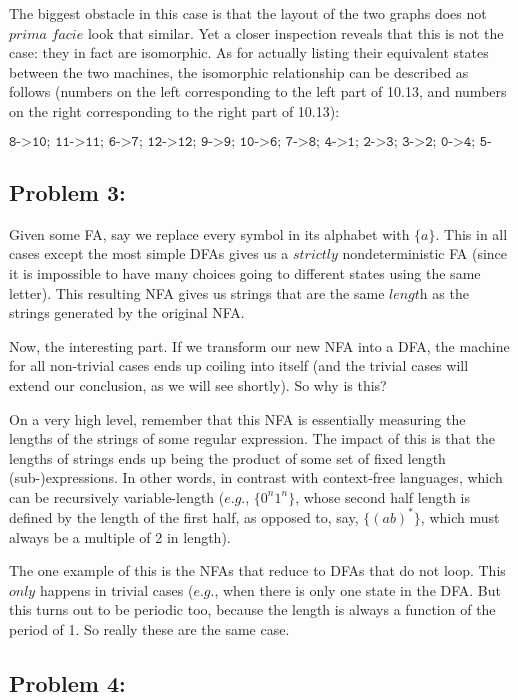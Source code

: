 \documentclass[a4paper]{article}
\begin{document}
The biggest obstacle in this case is that the layout of the two graphs does not $\textit{prima facie}$ look that similar. Yet a closer inspection reveals that this is not the case: they in fact are isomorphic. As for actually listing their equivalent states between the two machines, the isomorphic relationship can be described as follows (numbers on the left corresponding to the left part of 10.13, and numbers on the right corresponding to the right part of 10.13):

\begin{equation}
\texttt{8->10; 11->11; 6->7; 12->12; 9->9; 10->6; 7->8; 4->1; 2->3; 3->2; 0->4; 5->0; 1->5}
\end{equation}

\subsection*{Problem 3:}

Given some FA, say we replace every symbol in its alphabet with $\{a\}$. This in all cases except the most simple DFAs gives us a $\textit{strictly}$ nondeterministic FA (since it is impossible to have many choices going to different states using the same letter). This resulting NFA gives us strings that are the same $\textit{length}$ as the strings generated by the original NFA.

Now, the interesting part. If we transform our new NFA into a DFA, the machine for all non-trivial cases ends up coiling into itself (and the trivial cases will extend our conclusion, as we will see shortly). So why is this?

On a very high level, remember that this NFA is essentially measuring the lengths of the strings of some regular expression. The impact of this is that the lengths of strings ends up being the product of some set of fixed length (sub-)expressions. In other words, in contrast with context-free languages, which can be recursively variable-length ($\textit{e.g.}$, $\{0^n 1^n\}$, whose second half length is defined by the length of the first half, as opposed to, say, $\{(ab)^*\}$, which must always be a multiple of 2 in length).

The one example of this is the NFAs that reduce to DFAs that do not loop. This $\textit{only}$ happens in trivial cases ($\textit{e.g.}$, when there is only one state in the DFA. But this turns out to be periodic too, because the length is always a function of the period of 1. So really these are the same case.

\subsection*{Problem 4:}
\end{document}
